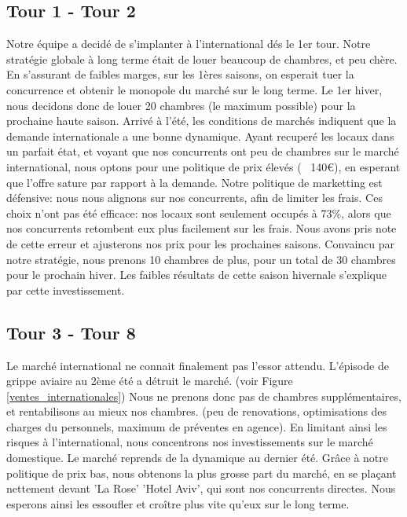 \documentclass[a4paper,10pt]{article}
\begin{document}
    \subsection{Tour 1 - Tour 2}
      Notre équipe a decidé de s'implanter à l'international dés le 1er tour.
      \newline
      Notre stratégie globale à long terme était de louer beaucoup de chambres, et peu chère. En s'assurant de faibles marges,
      sur les 1ères saisons, on esperait tuer la concurrence et obtenir le monopole du marché sur le long terme.
      \newline
      \newline
      Le 1er hiver, nous decidons donc de louer 20 chambres (le maximum possible) pour la prochaine haute saison.
      \newline
      \newline
      Arrivé à l'été, les conditions de marchés indiquent que la demande internationale a une bonne dynamique.
      Ayant recuperé les locaux dans un parfait état, et voyant que nos concurrents ont peu de chambres sur le marché international,
      nous optons pour une politique de prix élevés (~ 140€), en esperant que l'offre sature par rapport à la demande.
      Notre politique de marketting est défensive: nous nous alignons sur nos concurrents, afin de limiter les frais.
      \newline
      Ces choix n'ont pas été efficace: nos locaux sont seulement occupés à 73\%, alors que nos concurrents retombent eux plus facilement sur les frais.
      Nous avons pris note de cette erreur et ajusterons nos prix pour les prochaines saisons.
      \newline
      \newline
      Convaincu par notre stratégie, nous prenons 10 chambres de plus, pour un total de 30 chambres pour le prochain hiver.
      \newline
      Les faibles résultats de cette saison hivernale s'explique par cette investissement.
    \subsection{Tour 3 - Tour 8}
      Le marché international ne connait finalement pas l'essor attendu. L'épisode de grippe aviaire au 2ème été a détruit le marché.
      (voir Figure \ref{ventes_internationales})
      Nous ne prenons donc pas de chambres supplémentaires, et rentabilisons au mieux nos chambres. (peu de renovations, optimisations des charges du personnels, maximum de préventes en agence).
      \newline
      En limitant ainsi les risques à l'international, nous concentrons nos investissements sur le marché domestique.
      \newline
      \newline
      Le marché reprends de la dynamique au dernier été. Grâce à notre politique de prix bas, nous obtenons la plus grosse part du marché, en se plaçant nettement devant
      'La Rose' 'Hotel Aviv', qui sont nos concurrents directes. Nous esperons ainsi les essoufler et croître plus vite qu'eux sur le long terme.
\end{document}
